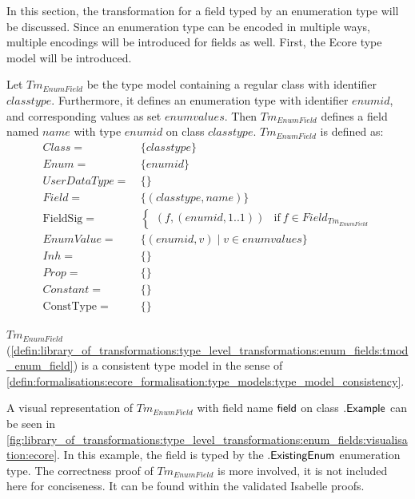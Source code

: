 In this section, the transformation for a field typed by an enumeration type will be discussed. Since an enumeration type can be encoded in multiple ways, multiple encodings will be introduced for fields as well. First, the Ecore type model will be introduced.

\begin{defin}
\label{defin:library_of_transformations:type_level_transformations:enum_fields:tmod_enum_field}
Let $Tm_{EnumField}$ be the type model containing a regular class with identifier $classtype$. Furthermore, it defines an enumeration type with identifier $enumid$, and corresponding values as set $enumvalues$. Then $Tm_{EnumField}$ defines a field named $name$ with type $enumid$ on class $classtype$. $Tm_{EnumField}$ is defined as:
\begin{align*}
Class =\ &\{classtype\} \\
Enum =\ &\{enumid\} \\
UserDataType =\ &\{\} \\
Field =\ &\{(classtype, name)\} \\
\mathrm{FieldSig} =\ &\begin{cases}
    (f, (enumid, 1..1)) &\mathrm{if}\ f \in Field_{Tm_{EnumField}}
\end{cases} \\
EnumValue =\ &\{(enumid, v) \mid v \in enumvalues\} \\
Inh =\ &\{\} \\
Prop =\ &\{\} \\
Constant =\ &\{\} \\
\mathrm{ConstType} =\ &\{\}
\end{align*}
\end{defin}

\begin{thm}
\label{defin:library_of_transformations:type_level_transformations:enum_fields:tmod_enum_field_correct}
$Tm_{EnumField}$ (\cref{defin:library_of_transformations:type_level_transformations:enum_fields:tmod_enum_field}) is a consistent type model in the sense of \cref{defin:formalisations:ecore_formalisation:type_models:type_model_consistency}.
\end{thm}

A visual representation of $Tm_{EnumField}$ with field name $\mathsf{field}$ on class $.\mathsf{Example}$ can be seen in \cref{fig:library_of_transformations:type_level_transformations:enum_fields:visualisation:ecore}. In this example, the field is typed by the $.\mathsf{ExistingEnum}$ enumeration type. The correctness proof of $Tm_{EnumField}$ is more involved, it is not included here for conciseness. It can be found within the validated Isabelle proofs.

